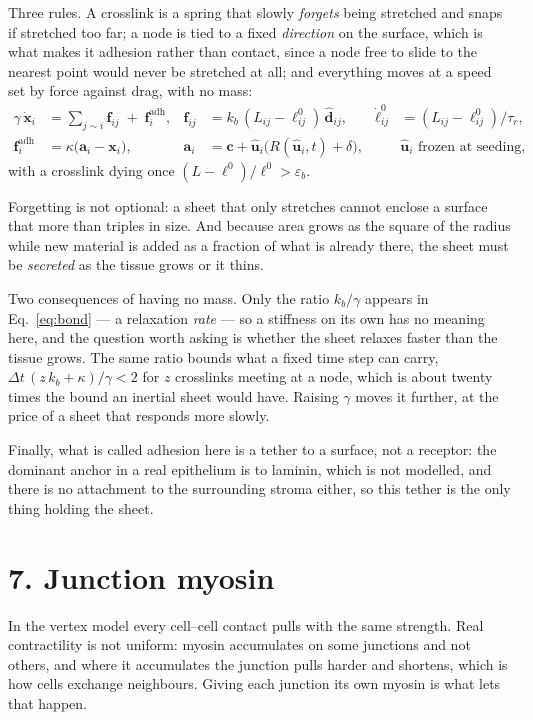 \documentclass[10pt,a4paper]{article}
\begin{document}
Three rules. A crosslink is a spring that slowly \emph{forgets} being stretched and snaps if stretched
too far; a node is tied to a fixed \emph{direction} on the surface, which is what makes it adhesion
rather than contact, since a node free to slide to the nearest point would never be stretched at all;
and everything moves at a speed set by force against drag, with no mass:
%
\begin{align}
\gamma\,\dot{\mathbf x}_i &= \sum_{j\sim i}\mathbf f_{ij} \;+\; \mathbf f^{\text{adh}}_i, &
\mathbf f_{ij}&=k_b\,(L_{ij}-\ell^0_{ij})\,\hat{\mathbf d}_{ij}, &
\dot\ell^0_{ij}&=(L_{ij}-\ell^0_{ij})/\tau_r,
\label{eq:bond}\\[2pt]
\mathbf f^{\text{adh}}_i&=\kappa\bigl(\mathbf a_i-\mathbf x_i\bigr), &
\mathbf a_i&=\mathbf c+\hat{\mathbf u}_i\bigl(R(\hat{\mathbf u}_i,t)+\delta\bigr), &
&\hat{\mathbf u}_i \text{ frozen at seeding,}
\label{eq:integrin}
\end{align}
%
with a crosslink dying once $(L-\ell^0)/\ell^0>\varepsilon_b$.

Forgetting is not optional: a sheet that only stretches cannot enclose a surface that more than triples
in size. And because area grows as the square of the radius while new material is added as a fraction of
what is already there, the sheet must be \emph{secreted} as the tissue grows or it thins.

Two consequences of having no mass. Only the ratio $k_b/\gamma$ appears in Eq.~\eqref{eq:bond} --- a
relaxation \emph{rate} --- so a stiffness on its own has no meaning here, and the question worth asking
is whether the sheet relaxes faster than the tissue grows. The same ratio bounds what a fixed time step
can carry, $\Delta t\,(z\,k_b+\kappa)/\gamma<2$ for $z$ crosslinks meeting at a node, which is about
twenty times the bound an inertial sheet would have. Raising $\gamma$ moves it further, at the price of a
sheet that responds more slowly.

Finally, what is called adhesion here is a tether to a surface, not a receptor: the dominant anchor in a
real epithelium is to laminin, which is not modelled, and there is no attachment to the surrounding
stroma either, so this tether is the only thing holding the sheet.

\section*{7.\; Junction myosin}

In the vertex model every cell--cell contact pulls with the same strength. Real contractility is not
uniform: myosin accumulates on some junctions and not others, and where it accumulates the junction
pulls harder and shortens, which is how cells exchange neighbours. Giving each junction its own myosin
is what lets that happen.
\end{document}
